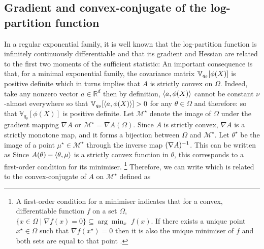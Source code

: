 \subsection{Gradient and convex-conjugate of the log-partition function}
In a regular exponential family, it is well known \citep[theorem 2.2]{brown86} that the log-partition function is infinitely continuously differentiable and that its gradient and Hessian are related to the first two moments of the sufficient statistic:
%
%
An important consequence is that, for a minimal exponential family, the covariance matrix $\mathbb V_{q_\theta}[\phi(X)]$ is positive definite which in turns implies that $A$ is strictly convex on $\Omega$. Indeed, take any nonzero vector $a\in\mathbb R^{d}$ then by definition, $\left\langle a,\phi(X) \right\rangle$ cannot be constant $\nu$-almost everywhere so that $\mathbb V_{q_{\theta}}[\left\langle a,\phi(X) \right\rangle] > 0$ for any $\theta\in\Omega$ and therefore:
so that $\mathbb V_{q_{\theta}}[\phi(X)]$ is positive definite. 
Let $\mathcal M^{\star}$ denote the image of $\Omega$ under the gradient mapping $\nabla A$ or $\mathcal M^{\star}=\nabla A(\Omega)$. Since $A$ is strictly convex, $\nabla A$ is a strictly monotone map, and it forms a bijection between $\Omega$ and $\mathcal M^{\star}$. Let $\theta^{\star}$ be the image of a point $\mu^{\star}\in\mathcal M^{\star}$ through the inverse map $(\nabla A)^{-1}$. 
This can be written as
%
%
Since $A(\theta)-\left\langle \theta,\mu \right\rangle$ is a strictly convex function in $\theta$, this corresponds to a first-order condition for its minimiser.
\footnote{A first-order condition for a minimiser indicates that for a convex, differentiable function $f$ on a set $\Omega$, $\{x\in\Omega\mid \nabla f(x)=0 \}\subseteq\arg\min_{x}\,\,f(x)$. If there exists a unique point $x^{\star}\in\Omega$ such that $\nabla f(x^{\star})=0$ then it is also the unique minimiser of $f$ and both sets are equal to that point \citep[theorem 27.1]{rockafellar70}. } Therefore, we can write
%
%
which is related to the convex-conjugate of $A$ on $\mathcal M^{\star}$ defined as
